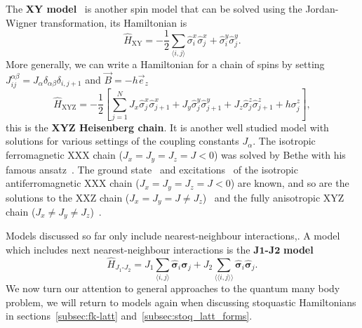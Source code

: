 The \textbf{XY model}~\cite{lieb1961two} is another spin model that can be solved using the Jordan-Wigner transformation, its Hamiltonian is
\begin{equation}
	\label{eq:h-xy}
\hat H_{\text{XY}}=-\frac{1}{2} \sum_{\langle i, j\rangle} \hat\sigma_{i}^{x} \hat\sigma_{j}^{x}+\hat\sigma_{i}^{y} \hat\sigma_{j}^{y}.
\end{equation}
More generally, we can write a Hamiltonian for a chain of spins by setting $J_{i j}^{\alpha \beta} = J_\alpha \delta_{\alpha \beta} \delta_{i, j+1}$ and $\vec{B} = -h \vec{e}_z$
\begin{equation}
	\label{eq:h-xyz}
	\hat H_{\text{XYZ}}= -\frac{1}{2}\left[ \sum_{j=1}^{N}J_{x} \hat \sigma_{j}^{x} \hat \sigma_{j+1}^{x}+J_{y} \hat \sigma_{j}^{y} \hat \sigma_{j+1}^{y}+J_{z} \hat \sigma_{j}^{z} \hat \sigma_{j+1}^{z} + h \sigma_{j}^{z}
	\right],
\end{equation}
this is the \textbf{XYZ Heisenberg chain}. It is another well studied model with solutions for various settings of the coupling constants $J_\alpha$. The isotropic ferromagnetic XXX chain ($J_x = J_y = J_z = J < 0$) was solved by Bethe with his famous ansatz~\cite{bethe1931theorie}. The ground state~\cite{hulthen1938austauschproblem} and excitations~\cite{des1962spin} of the isotropic antiferromagnetic XXX chain ($J_x = J_y = J_z = J < 0$) are known, and so are the solutions to the XXZ chain ($J_x = J_y = J \neq J_z$)~\cite{yang1966three, yang1966one, yang1966two} and the fully anisotropic XYZ chain ($J_x \neq J_y \neq J_z$)~\cite{baxter1972one}. 

Models discussed so far only include nearest-neighbour interactions,. A model which includes next nearest-neighbour interactions is the $\mathbf{J1}$\textbf{-}$\mathbf{J2}$ \textbf{model}
\begin{equation}
	\label{eq:h-j1j2}
	\hat H_{J_1\text{-}J_2} = J_1 \sum_{\langle i, j \rangle} \mathbf{\hat \sigma}_i \mathbf{\hat \sigma}_j + J_2 \sum_{\langle\langle i, j \rangle\rangle} \mathbf{\hat \sigma}_i \mathbf{\hat \sigma}_j.
\end{equation}
We now turn our attention to general approaches to the quantum many body problem, we will return to models again when discussing stoquastic Hamiltonians in sections~\ref{subsec:fk-latt} and~\ref{subsec:stoq_latt_forms}.

